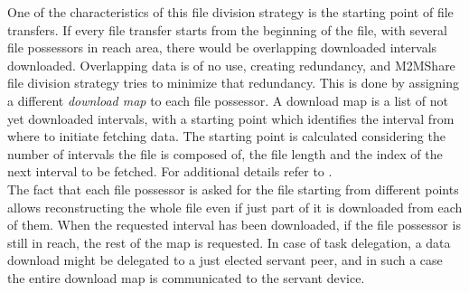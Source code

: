 One of the characteristics of this file division strategy is the starting point of file transfers. If every file transfer starts from the beginning of the file, with several file possessors in reach area, there would be overlapping downloaded intervals downloaded. Overlapping data is of no use, creating redundancy, and M2MShare file division strategy tries to minimize that redundancy. This is done by assigning a different \textit{download map} to each file possessor. A download map is a list of not yet downloaded intervals, with a starting point which identifies the interval from where to initiate fetching data. The starting point is calculated considering the number of intervals the file is composed of, the file length and the index of the next interval to be fetched. For additional details refer to \cite{tesiarmir}.
\\

The fact that each file possessor is asked for the file starting from different points allows reconstructing the whole file even if just part of it is downloaded from each of them. When the requested interval has been downloaded, if the file possessor is still in reach, the rest of the map is requested. In case of task delegation, a data download might be delegated to a just elected servant peer, and in such a case the entire download map is communicated to the servant device.
 
 

